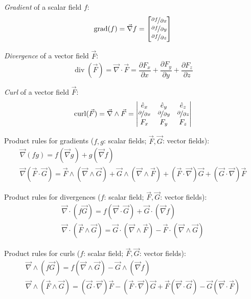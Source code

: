 \documentclass[fontsize=11pt,a4paper]{scrartcl}
\DeclareMathOperator{\grad}{grad}
\DeclareMathOperator{\Div}{div}
\DeclareMathOperator{\curl}{curl}
\begin{document}
\emph{Gradient} of a scalar field $f$:
\[
	\grad(f) = \vec\nabla f = \begin{bmatrix}\nicefrac{\partial f}{\partial x}\\
	                                         \nicefrac{\partial f}{\partial y}\\
	                                         \nicefrac{\partial f}{\partial z}
	                          \end{bmatrix}
\]

\emph{Divergence} of a vector field $\vec F$:
\[
	\Div(\vec F) = \vec\nabla\cdot\vec F = \frac{\partial F_x}{\partial x}
	                                       + \frac{\partial F_y}{\partial y}
	                                       + \frac{\partial F_z}{\partial z}
\]

\emph{Curl} of a vector field $\vec F$:
\[
	\curl(\vec F) = \vec\nabla\wedge\vec F = \begin{vmatrix}\hat e_x & \hat e_y & \hat e_z\\
	                                                        \nicefrac{\partial}{\partial x} & \nicefrac{\partial}{\partial y} & \nicefrac{\partial}{\partial z}\\
	                                                        F_x & F_y & F_z
	                                         \end{vmatrix}
\]

Product rules for gradients ($f,g$: scalar fields; $\vec F,\vec G$: vector fields):
\begin{gather*}
	\vec\nabla(fg) = f(\vec\nabla g) + g(\vec\nabla f)\\
	\vec\nabla(\vec F\cdot\vec G) = \vec F\wedge(\vec\nabla\wedge\vec G) + \vec G\wedge(\vec\nabla\wedge\vec F)
	                               +(\vec F\cdot\vec\nabla)\vec G + (\vec G\cdot\vec\nabla)\vec F
\end{gather*}

Product rules for divergences ($f$: scalar field; $\vec F,\vec G$: vector fields):
\begin{gather*}
	\vec\nabla\cdot(f\vec G) = f(\vec\nabla\cdot\vec G) + \vec G\cdot(\vec\nabla f)\\
	\vec\nabla\cdot(\vec F\wedge\vec G) = \vec G\cdot(\vec\nabla\wedge\vec F) - \vec F\cdot(\vec\nabla\wedge\vec G)
\end{gather*}

Product rules for curls ($f$: scalar field; $\vec F,\vec G$: vector fields):
\begin{gather*}
	\vec\nabla\wedge(f\vec G) = f(\vec\nabla\wedge\vec G) - \vec G\wedge(\vec\nabla f)\\
	\vec\nabla\wedge(\vec F\wedge\vec G) = (\vec G\cdot\vec\nabla)\vec F - (\vec F\cdot\vec\nabla)\vec G+\vec F(\vec\nabla\cdot\vec G) - \vec G(\vec\nabla\cdot\vec F)
\end{gather*}
\end{document}
